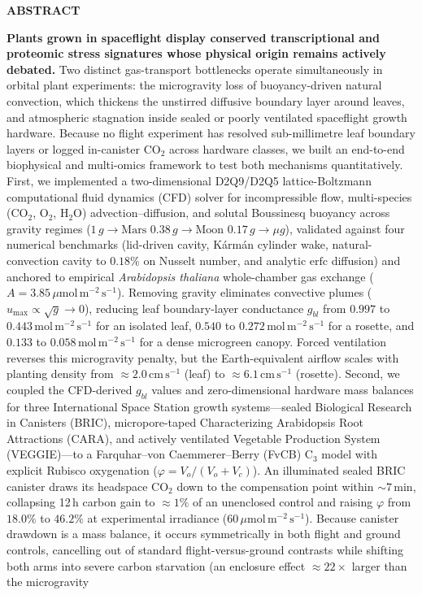 \documentclass[10pt,twocolumn,a4paper]{article}
\newcommand{\ums}{\ensuremath{\mu\mathrm{mol\,m^{-2}\,s^{-1}}}}
\newcommand{\cmsu}{\ensuremath{\mathrm{cm\,s^{-1}}}}
\newcommand{\molms}{\ensuremath{\mathrm{mol\,m^{-2}\,s^{-1}}}}
\begin{document}
{  \vspace{4mm}
  \begin{tcolorbox}[colback=npjlgtgray,colframe=npjteal,arc=3mm,left=4mm,right=4mm,top=3mm,bottom=3mm,boxrule=1.2pt]
    {\sffamily\bfseries\color{npjteal}\normalsize ABSTRACT\vspace{1.5mm}}\par
    {\fontsize{9.5}{13.5}\selectfont\sffamily
    \textbf{Plants grown in spaceflight display conserved transcriptional and proteomic stress signatures whose physical origin remains actively debated.} Two distinct gas-transport bottlenecks operate simultaneously in orbital plant experiments: the microgravity loss of buoyancy-driven natural convection, which thickens the unstirred diffusive boundary layer around leaves, and atmospheric stagnation inside sealed or poorly ventilated spaceflight growth hardware. Because no flight experiment has resolved sub-millimetre leaf boundary layers or logged in-canister $\mathrm{CO_2}$ across hardware classes, we built an end-to-end biophysical and multi-omics framework to test both mechanisms quantitatively. First, we implemented a two-dimensional D2Q9/D2Q5 lattice-Boltzmann computational fluid dynamics (CFD) solver for incompressible flow, multi-species ($\mathrm{CO_2}$, $\mathrm{O_2}$, $\mathrm{H_2O}$) advection--diffusion, and solutal Boussinesq buoyancy across gravity regimes ($1\,g \to \text{Mars } 0.38\,g \to \text{Moon } 0.17\,g \to \mu g$), validated against four numerical benchmarks (lid-driven cavity, K\'arm\'an cylinder wake, natural-convection cavity to $0.18\%$ on Nusselt number, and analytic $\mathrm{erfc}$ diffusion) and anchored to empirical \textit{Arabidopsis thaliana} whole-chamber gas exchange ($A = 3.85\,\ums$). Removing gravity eliminates convective plumes ($u_{\max}\propto\sqrt{g}\to 0$), reducing leaf boundary-layer conductance $g_{bl}$ from $0.997$ to $0.443\,\molms$ for an isolated leaf, $0.540$ to $0.272\,\molms$ for a rosette, and $0.133$ to $0.058\,\molms$ for a dense microgreen canopy. Forced ventilation reverses this microgravity penalty, but the Earth-equivalent airflow scales with planting density from $\approx 2.0\,\cmsu$ (leaf) to $\approx 6.1\,\cmsu$ (rosette). Second, we coupled the CFD-derived $g_{bl}$ values and zero-dimensional hardware mass balances for three International Space Station growth systems---sealed Biological Research in Canisters (BRIC), micropore-taped Characterizing Arabidopsis Root Attractions (CARA), and actively ventilated Vegetable Production System (VEGGIE)---to a Farquhar--von Caemmerer--Berry (FvCB) $\mathrm{C_3}$ model with explicit Rubisco oxygenation ($\varphi = V_o/(V_o+V_c)$). An illuminated sealed BRIC canister draws its headspace $\mathrm{CO_2}$ down to the compensation point within $\sim 7\,\mathrm{min}$, collapsing 12\,h carbon gain to $\approx 1\%$ of an unenclosed control and raising $\varphi$ from $18.0\%$ to $46.2\%$ at experimental irradiance ($60\,\ums$). Because canister drawdown is a mass balance, it occurs symmetrically in both flight and ground controls, cancelling out of standard flight-versus-ground contrasts while shifting both arms into severe carbon starvation (an enclosure effect $\approx 22\times$ larger than the microgravity }
\end{tcolorbox}}
\end{document}
